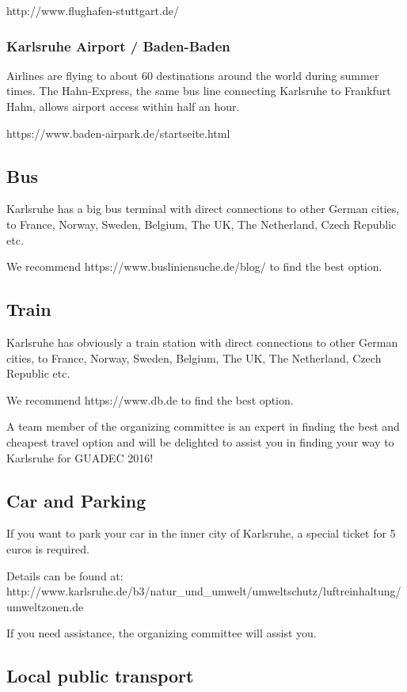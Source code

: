 http://www.flughafen-stuttgart.de/

\subsubsection{Karlsruhe Airport / Baden-Baden}

Airlines are flying to about 60 destinations around the world during summer times. The Hahn-Express, the same bus line connecting Karlsruhe to Frankfurt Hahn, allows airport access within half an hour.
 
https://www.baden-airpark.de/startseite.html

\subsection{Bus}

Karlsruhe has a big bus terminal with direct connections to other German cities, to France, Norway, Sweden, Belgium, The UK, The Netherland, Czech Republic etc.

We recommend https://www.busliniensuche.de/blog/ to find the best option.

\subsection{Train}

Karlsruhe has obviously a train station with direct connections to other German cities, to France, Norway, Sweden, Belgium, The UK, The Netherland, Czech Republic etc.

We recommend https://www.db.de to find the best option.

A team member of the organizing committee is an expert in finding the best and cheapest travel option and will be delighted to assist you in finding your way to Karlsruhe for GUADEC 2016!

\subsection{Car and Parking}

If you want to park your car in the inner city of Karlsruhe, a special ticket for 5 euros is required. 

Details can be found at:
http://www.karlsruhe.de/b3/natur_und_umwelt/umweltschutz/luftreinhaltung/umweltzonen.de

If you need assistance, the organizing committee will assist you.

\subsection{Local public transport}



